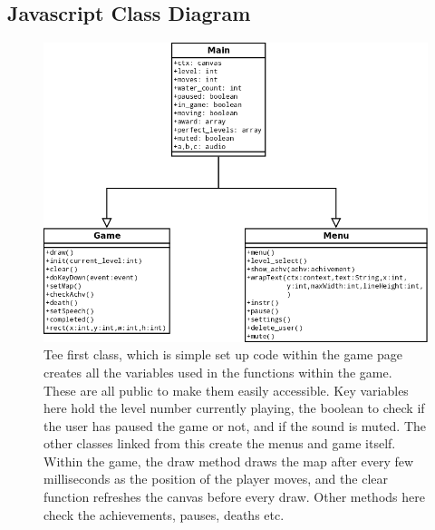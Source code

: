 \documentclass[a4paper]{article}
\begin{document}
\subsection{Javascript Class Diagram}
\begin{figure}[!ht]
   \centering
   \includegraphics[scale=0.5]{class.png}
  \caption{Tee first class, which is simple set up code within the game page
creates all the variables used in the functions within the game. These are all
public to make them easily accessible. Key variables here hold the level number
currently playing, the boolean to check if the user has paused the game or not,
and if the sound is muted. The other classes linked from this create the menus
and game itself. Within the game, the draw method draws the map after every few
milliseconds as the position of the player moves, and the clear function
refreshes the canvas before every draw. Other methods here check the
achievements, pauses, deaths etc.}
   \end{figure}
  \clearpage
\end{document}
